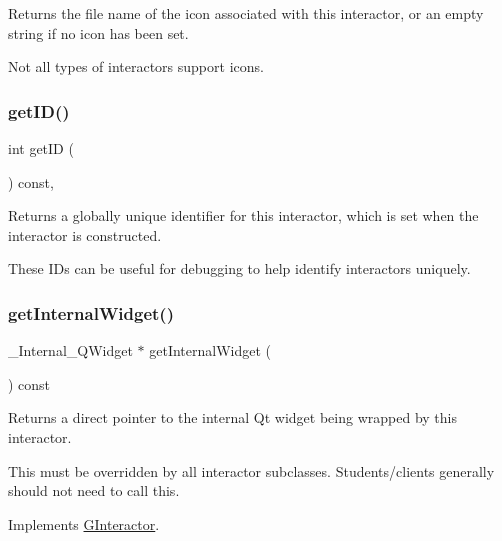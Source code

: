 Returns the file name of the icon associated with this interactor, or an empty string if no icon has been set. 

Not all types of interactors support icons. \mbox{\label{classGInteractor_a9c9659a6c6ba66b4107ba59c95a24241}} 
\subsubsection{\texorpdfstring{get\+I\+D()}{getID()}}
{\footnotesize\ttfamily int get\+ID (\begin{DoxyParamCaption}{ }\end{DoxyParamCaption}) const\hspace{0.3cm}{\ttfamily [virtual]}, {\ttfamily [inherited]}}



Returns a globally unique identifier for this interactor, which is set when the interactor is constructed. 

These I\+Ds can be useful for debugging to help identify interactors uniquely. \mbox{\label{classGCanvas_a208ce13c1da40bf0ddb509daf99d6588}} 
\subsubsection{\texorpdfstring{get\+Internal\+Widget()}{getInternalWidget()}}
{\footnotesize\ttfamily \+\_\+\+Internal\+\_\+\+Q\+Widget $\ast$ get\+Internal\+Widget (\begin{DoxyParamCaption}{ }\end{DoxyParamCaption}) const\hspace{0.3cm}{\ttfamily [virtual]}}



Returns a direct pointer to the internal Qt widget being wrapped by this interactor. 

This must be overridden by all interactor subclasses. Students/clients generally should not need to call this. 

Implements \mbox{\hyperlink{classGInteractor}{G\+Interactor}}.

\mbox{\label{classGDrawingSurface_aaf1f5ea8281e5e3486662878d26f0a13}} 

